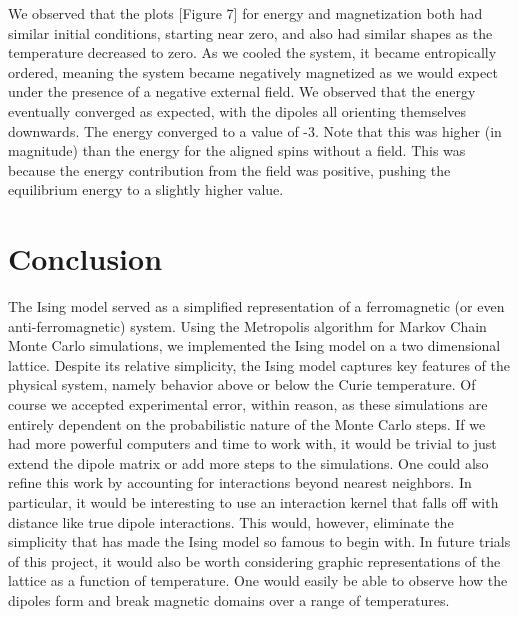 \documentclass[11pt]{article}
\begin{document}
We observed that the plots [Figure 7] for energy and magnetization both had similar initial conditions, starting near zero, and also had similar shapes as the temperature decreased to zero. As we cooled the system, it became entropically ordered, meaning the system became negatively magnetized as we would expect under the presence of a negative external field. We observed that the energy eventually converged as expected, with the dipoles all orienting themselves downwards. The energy converged to a value of -3. Note that this was higher (in magnitude) than the energy for the aligned spins without a field. This was because the energy contribution from the field was positive, pushing the equilibrium energy to a slightly higher value.

\section{Conclusion}

The Ising model served as a simplified representation of a ferromagnetic (or even anti-ferromagnetic) system. Using the Metropolis algorithm for Markov Chain Monte Carlo simulations, we implemented the Ising model on a two dimensional lattice. Despite its relative simplicity, the Ising model captures key features of the physical system, namely behavior above or below the Curie temperature. Of course we accepted experimental error, within reason, as these simulations are entirely dependent on the probabilistic nature of the Monte Carlo steps. If we had more powerful computers and time to work with, it would be trivial to just extend the dipole matrix or add more steps to the simulations. One could also refine this work by accounting for interactions beyond nearest neighbors. In particular, it would be interesting to use an interaction kernel that falls off with distance like true dipole interactions. This would, however, eliminate the simplicity that has made the Ising model so famous to begin with. In future trials of this project, it would also be worth considering graphic representations of the lattice as a function of temperature. One would easily be able to observe how the dipoles form and break magnetic domains over a range of temperatures.
\end{document}
